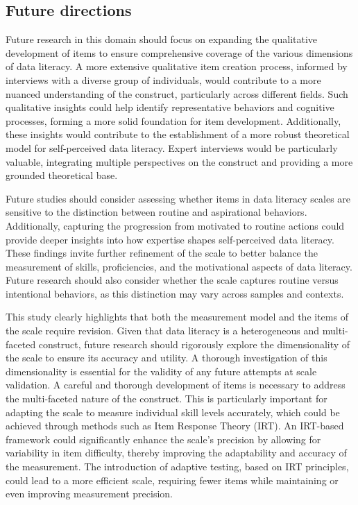 \documentclass[
  12pt,
  a4paper,
  twoside]{article}
\begin{document}
\subsection{Future directions}\label{future-directions}

Future research in this domain should focus on expanding the qualitative development of items to ensure comprehensive coverage of the various dimensions of data literacy. A more extensive qualitative item creation process, informed by interviews with a diverse group of individuals, would contribute to a more nuanced understanding of the construct, particularly across different fields. Such qualitative insights could help identify representative behaviors and cognitive processes, forming a more solid foundation for item development. Additionally, these insights would contribute to the establishment of a more robust theoretical model for self-perceived data literacy. Expert interviews would be particularly valuable, integrating multiple perspectives on the construct and providing a more grounded theoretical base.

Future studies should consider assessing whether items in data literacy scales are sensitive to the distinction between routine and aspirational behaviors. Additionally, capturing the progression from motivated to routine actions could provide deeper insights into how expertise shapes self-perceived data literacy.
These findings invite further refinement of the scale to better balance the measurement of skills, proficiencies, and the motivational aspects of data literacy.
Future research should also consider whether the scale captures routine versus intentional behaviors, as this distinction may vary across samples and contexts.

This study clearly highlights that both the measurement model and the items of the scale require revision. Given that data literacy is a heterogeneous and multi-faceted construct, future research should rigorously explore the dimensionality of the scale to ensure its accuracy and utility. A thorough investigation of this dimensionality is essential for the validity of any future attempts at scale validation.
A careful and thorough development of items is necessary to address the multi-faceted nature of the construct. This is particularly important for adapting the scale to measure individual skill levels accurately, which could be achieved through methods such as Item Response Theory (IRT). An IRT-based framework could significantly enhance the scale's precision by allowing for variability in item difficulty, thereby improving the adaptability and accuracy of the measurement. The introduction of adaptive testing, based on IRT principles, could lead to a more efficient scale, requiring fewer items while maintaining or even improving measurement precision.
\end{document}
